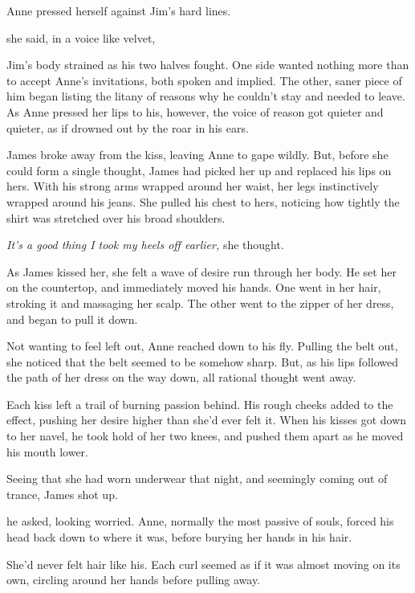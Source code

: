 Anne pressed herself against Jim's hard lines.

 she said, in a voice like velvet, 

Jim's body strained as his two halves fought.
One side wanted nothing more than to accept Anne's invitations, both spoken and implied.
The other, saner piece of him began listing the litany of reasons why he couldn't stay and needed to leave.
As Anne pressed her lips to his, however, the voice of reason got quieter and quieter, as if drowned out by the roar in his ears.

James broke away from the kiss, leaving Anne to gape wildly.
But, before she could form a single thought, James had picked her up and replaced his lips on hers.
With his strong arms wrapped around her waist, her legs instinctively wrapped around his jeans.
She pulled his chest to hers, noticing how tightly the shirt was stretched over his broad shoulders.

\textit{It's a good thing I took my heels off earlier,} she thought.

As James kissed her, she felt a wave of desire run through her body.
He set her on the countertop, and immediately moved his hands.
One went in her hair, stroking it and massaging her scalp.
The other went to the zipper of her dress, and began to pull it down.

Not wanting to feel left out, Anne reached down to his fly.
Pulling the belt out, she noticed that the belt seemed to be somehow sharp.
But, as his lips followed the path of her dress on the way down, all rational thought went away.

Each kiss left a trail of burning passion behind.
His rough cheeks added to the effect, pushing her desire higher than she'd ever felt it.
When his kisses got down to her navel, he took hold of her two knees, and pushed them apart as he moved his mouth lower.

Seeing that she had worn underwear that night, and seemingly coming out of trance, James shot up.

 he asked, looking worried.
Anne, normally the most passive of souls, forced his head back down to where it was, before burying her hands in his hair.

She'd never felt hair like his.
Each curl seemed as if it was almost moving on its own, circling around her hands before pulling away.
